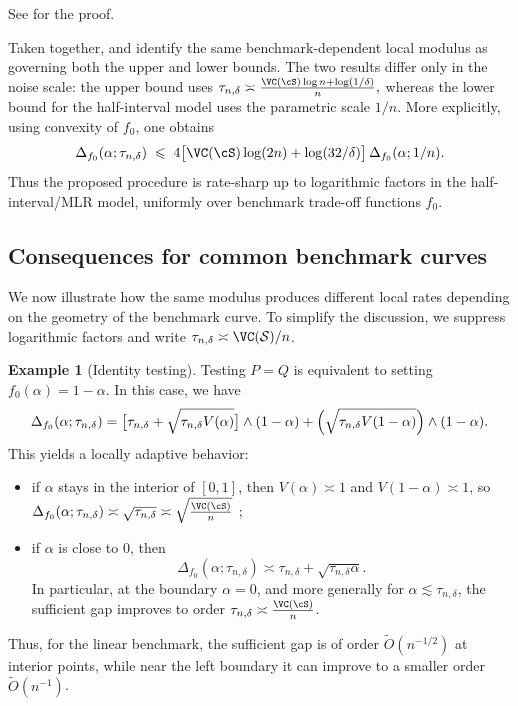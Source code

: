 \documentclass[english]{article}
\theoremstyle{plain}
\theoremstyle{definition}
\newtheorem{example}{Example}[section]
\newcommand{\fnull}{f_0}
\newcommand{\tauND}{\tau_{n,\delta}}               %
\begin{document}
\noindent See  for the proof.
\medskip


Taken together,  and
 identify the same benchmark-dependent local
modulus as governing both the upper and lower bounds. The two results differ
only in the noise scale: the upper bound uses
$
\tau_{n,\delta}\asymp
\frac{\VC(\cS)\log n+\log(1/\delta)}{n},
$
whereas the lower bound for the half-interval model uses the parametric scale
\(1/n\). More explicitly, using convexity of \(\fnull\), one obtains
\[
\Delta_{\fnull}(\alpha; \tau_{n,\delta})
\;\leqslant\;
4\bigl[\VC(\cS)\log(2n)+\log(32/\delta)\bigr]\,
\Delta_{\fnull}(\alpha;1/n).
\]
Thus the proposed procedure is rate-sharp
up to logarithmic factors in the half-interval/MLR model, uniformly over
benchmark trade-off functions \(\fnull\).



\subsection{Consequences for common benchmark curves}


We now illustrate how the same modulus produces different local rates depending
on the geometry of the benchmark curve. To simplify the discussion, we suppress
logarithmic factors and write \(\tau_{n,\delta}\asymp \VC(\mathcal S)/n\).

\begin{example}[Identity testing]
\label{ex:gap-linear}
Testing $P=Q$ is equivalent to setting  $\fnull(\alpha)=1-\alpha$. In this case, we have  
\begin{equation}
\Delta_{\fnull}(\alpha;\tauND)
=
\bigl[\tauND+\sqrt{\tauND V(\alpha)}\bigr]\wedge (1-\alpha)
+
\Bigl(\sqrt{\tauND V(1-\alpha)}\Bigr)\wedge (1-\alpha).
\label{eq:Delta-linear}
\end{equation}
This yields a locally adaptive behavior:
\begin{itemize}
\item if \(\alpha\) stays in the interior of \([0,1]\), then
\(V(\alpha)\asymp 1\) and \(V(1-\alpha)\asymp 1\), so
\(\Delta_{\fnull}(\alpha;\tauND)\asymp \sqrt{\tauND}\asymp \sqrt{\frac{\VC(\cS)}{n}}\) ;
\item if \(\alpha\) is close to \(0\), then
\[
\Delta_{\fnull}(\alpha;\tauND)
\asymp
\tauND+\sqrt{\tauND\alpha}.
\]
In particular, at the boundary \(\alpha=0\), and more generally for
\(\alpha\lesssim \tauND\), the sufficient gap improves to order
\(\tauND \asymp \frac{\VC(\cS)}{n}\).
\end{itemize}
Thus, for the linear benchmark, the sufficient gap is of order
\(\widetilde O(n^{-1/2})\) at interior points, while near the left
boundary it can improve to a smaller order \(\widetilde O(n^{-1})\).
\end{example}
\end{document}
